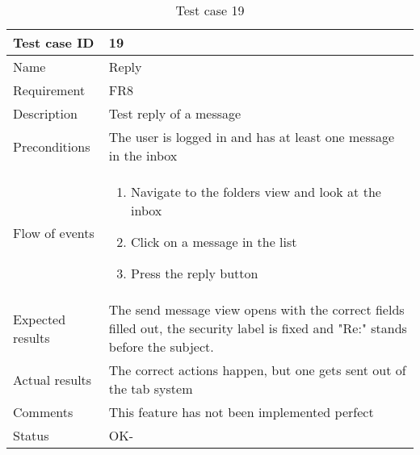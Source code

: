 		\clearpage

		\begin{table}
			\begin{tabular}{l|p{10cm}}
				Test case ID & 19 \\ \hline
				Name & Reply\\ \hline
				Requirement & FR8\\ \hline
				Description & Test reply of a message\\ \hline
				Preconditions & The user is logged in and has at least one message in the inbox\\ \hline
				Flow of events & 
					\begin{enumerate}
						\item{}Navigate to the folders view and look at the inbox
						\item{}Click on a message in the list
						\item{}Press the reply button
					\end{enumerate} \\ \hline
				Expected results & The send message view opens with the correct fields filled out, the security label is fixed and "Re:" stands before the subject. \\ \hline
				Actual results &The correct actions happen, but one gets sent out of the tab system\\ \hline
				Comments & This feature has not been implemented perfect\\ \hline
				Status & OK-\\ \hline
			\end{tabular}
			\caption{Test case 19} \label{tab:case19}
		\end{table}

